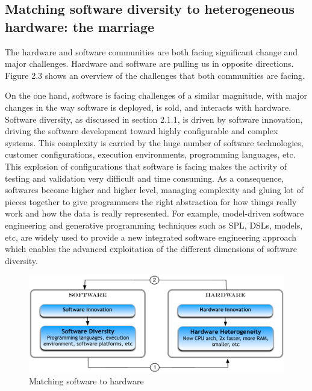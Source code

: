 

\subsection{Matching software diversity to heterogeneous hardware: the marriage}



The hardware and software communities are both facing significant change and major challenges. Hardware and software are pulling us in opposite directions. Figure 2.3 shows an overview of the challenges that both communities are facing.  

On the one hand, software is facing challenges of a similar magnitude, with major changes in the way software is deployed, is sold, and interacts with hardware. 
Software diversity, as discussed in section 2.1.1, is driven by software innovation, driving the software development toward highly configurable and complex systems. This complexity is carried by the huge number of software technologies, customer configurations, execution environments, programming languages, etc. This explosion of configurations that software is facing makes the activity of testing and validation very difficult and time consuming. 
As a consequence, softwares become higher and higher level, managing complexity and gluing lot of pieces together to give programmers the right abstraction for how things really work and how the data is really represented. 
For example, model-driven software engineering and generative programming techniques such as SPL, DSLs, models, etc, are widely used to provide a new integrated software engineering approach which enables the advanced exploitation of the different dimensions of software diversity.

\begin{figure}[h]
	\center
	\includegraphics[scale=0.65]{Background/fig/marriage}
	\caption{Matching software to hardware}
\end{figure}


